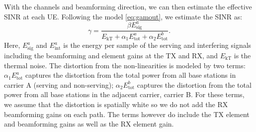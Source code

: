 With the channels and beamforming
direction, we can then estimate the effective
SINR at each UE.  
Following the model \eqref{eq:gamout},
we estimate the SINR as:
\begin{equation}
\label{eq:SNR}
    \gamma = \frac{\beta E_\mathrm{sig}^{a}}{E_\mathrm{kT} +
    \alpha_{1}E_\mathrm{tot}^{a} + \alpha_{2}E_\mathrm{tot}^{b}}.
\end{equation}
Here, $E_\mathrm{sig}^{a}$ 
and $E_\mathrm{int}^a$ 
is the energy 
per sample of the serving and interfering
signals including the beamforming and
element gains at the TX and RX,
and $E_\mathrm{kT}$ is the thermal noise.
The distortion from the non-linearities
is modeled by two terms:
$\alpha_{1}E_\mathrm{tot}^{a}$ captures
the distortion from the total power from all base stations in carrier A (serving and non-serving); $\alpha_{2}E_\mathrm{tot}^{b}$
captures the distortion from
the total power from all base stations
in the adjacent carrier, carrier B.
For these terms, we assume that the distortion
is spatially white so we do not 
add the RX beamforming gains on each path.
The terms however do include the TX element
and beamforming gains as well as the RX element
gain.

